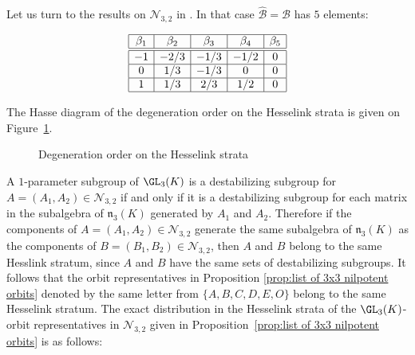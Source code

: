 \documentclass[12pt]{amsart}
\newcommand{\field}{K}
\begin{document}
Let us turn to the results on $\mathcal{N}_{3,2}$ in \cite{lebruyn}. 
In that case $\widehat{\mathcal{B}}=\mathcal{B}$ has $5$ elements: 

\[\begin{array}{|c|c|c|c|c|}
\hline
 \beta_1& \beta_2&\beta_3&\beta_4&\beta_5 \\ \hline \hline 
-1& -2/3& -1/3& -1/2& 0 \\
\hline
0 & 1/3& -1/3& 0& 0 \\
\hline
1& 1/3& 2/3 & 1/2& 0 \\
\hline
\end{array}\]

\vspace{4pt}

The Hasse diagram of the degeneration order on the Hesselink strata is given on 
Figure~\ref{figure:hasse2}.  

\begin{figure}[ht] 
\centering
\caption{Degeneration order on the Hesselink strata}
\vspace{1em}
\label{figure:hasse2}
\end{figure}

A $1$-parameter subgroup of $\GL_3(\field)$ is a destabilizing 
subgroup for $A=(A_1,A_2)\in\mathcal{N}_{3,2}$ 
if and only if it is a destabilizing subgroup for each matrix in the subalgebra of $\mathfrak{n}_3(\field)$ generated by $A_1$ and $A_2$. 
Therefore if the components of $A=(A_1,A_2)\in\mathcal{N}_{3,2}$ generate the same subalgebra of $\mathfrak{n}_3(\field)$ as the components of 
$B=(B_1,B_2)\in\mathcal{N}_{3,2}$, then $A$ and $B$ belong to the same 
Hesslink stratum, since $A$ and $B$ have the same sets of destabilizing subgroups. 
It follows that the orbit representatives in Proposition \ref{prop:list of 3x3 nilpotent orbits} denoted by the same letter from $\{A,B,C,D,E,O\}$ belong to the same Hesselink stratum. 
The exact distribution in the Hesselink strata of the $\GL_3(\field)$-orbit representatives in $\mathcal{N}_{3,2}$ given in Proposition~\ref{prop:list of 3x3 nilpotent orbits} 
is as follows:  
\end{document}
